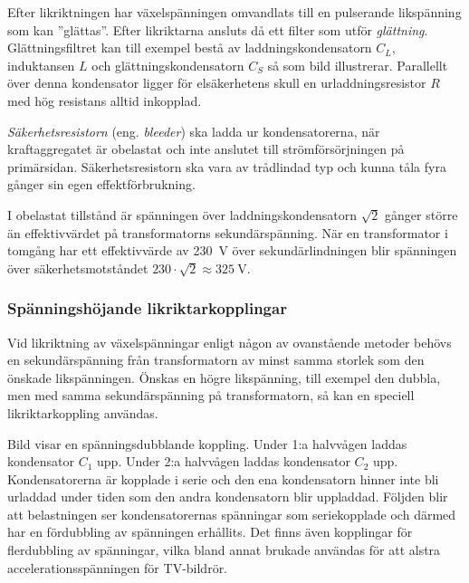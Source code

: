 
Efter likriktningen har växelspänningen omvandlats till en pulserande
likspänning som kan ''glättas''.
Efter likriktarna ansluts då ett filter som utför \emph{glättning}.
Glättningsfiltret kan till exempel bestå av laddningskondensatorn \(C_L\),
induktansen \(L\) och glättningskondensatorn \(C_S\) så som bild 
illustrerar.
Parallellt över denna kondensator ligger för elsäkerhetens skull en
urladdningsresistor \(R\) med hög resistans alltid inkopplad.

\emph{Säkerhetsresistorn} (eng. \emph{bleeder}) ska ladda ur kondensatorerna,
när kraftaggregatet är obelastat och inte anslutet till strömförsörjningen på primärsidan.
Säkerhetsresistorn ska vara av trådlindad typ och kunna tåla fyra gånger sin
egen effektförbrukning.

I obelastat tillstånd är spänningen över laddningskondensatorn \(\sqrt{2}\)
gånger större än effektivvärdet på transformatorns sekundärspänning.
När en transformator i tomgång har ett effektivvärde av \SI{230}{\volt} över
sekundärlindningen blir spänningen över säkerhetsmotståndet
\(230\cdot\sqrt{2} \approx \SI{325}{\volt}\).

\subsubsection{Spänningshöjande likriktarkopplingar}

Vid likriktning av växelspänningar enligt någon av ovanstående metoder behövs
en sekundärspänning från transformatorn av minst samma storlek som den önskade
likspänningen.
Önskas en högre likspänning, till exempel den dubbla, men med samma sekundärspänning
på transformatorn, så kan en speciell likriktarkoppling användas.


Bild  visar en spänningsdubblande koppling.
Under 1:a halvvågen laddas kondensator \(C_1\) upp.
Under 2:a halvvågen laddas kondensator \(C_2\) upp.
Kondensatorerna är kopplade i serie och den ena kondensatorn hinner inte bli
urladdad under tiden som den andra kondensatorn blir uppladdad.
Följden blir att belastningen ser kondensatorernas spänningar som seriekopplade
och därmed har en fördubbling av spänningen erhållits.
Det finns även kopplingar för flerdubbling av spänningar, vilka bland annat
brukade användas för att alstra accelerationsspänningen för TV-bildrör.

